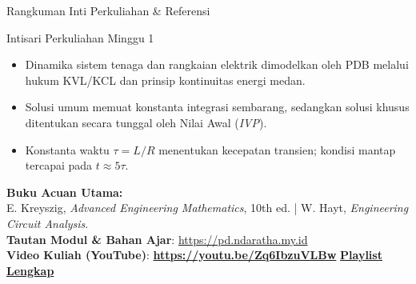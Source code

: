 \documentclass[aspectratio=169,10pt]{beamer}
\begin{document}
\begin{frame}{Rangkuman Inti Perkuliahan \& Referensi}
  \begin{exampleblock}{Intisari Perkuliahan Minggu 1}
    \begin{itemize}
      \item Dinamika sistem tenaga dan rangkaian elektrik dimodelkan oleh PDB melalui hukum KVL/KCL dan prinsip kontinuitas energi medan.
      \item Solusi umum memuat konstanta integrasi sembarang, sedangkan solusi khusus ditentukan secara tunggal oleh Nilai Awal (\textit{IVP}).
      \item Konstanta waktu $\tau = L/R$ menentukan kecepatan transien; kondisi mantap tercapai pada $t \approx 5\tau$.
    \end{itemize}
  \end{exampleblock}
  \vspace{0.2cm}
  \begin{center}
    \small \textbf{Buku Acuan Utama:} \\
    E. Kreyszig, \textit{Advanced Engineering Mathematics}, 10th ed. | W. Hayt, \textit{Engineering Circuit Analysis}. \\
    \vspace{0.3cm}
    \textbf{Tautan Modul \& Bahan Ajar}: \url{https://pd.ndaratha.my.id} \\[0.12cm]\textbf{Video Kuliah (YouTube)}: {\color{red!85!black}\textbf{\url{https://youtu.be/Zq6IbzuVLBw}}} \quad \textbar \quad \href{https://www.youtube.com/playlist?list=PLS5oOZWXZeTw}{\color{unibblue}\textbf{Playlist Lengkap}}
  \end{center}
\end{frame}
\end{document}
